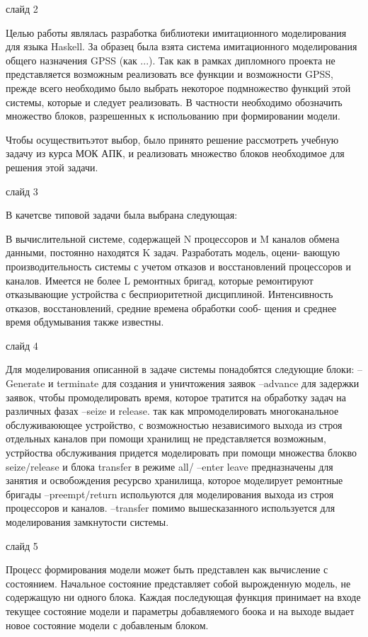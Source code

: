 \documentclass[utf8x, 12pt]{G7-32} %
\begin{document}
\thispagestyle{empty} 


слайд 2

Целью работы являлась разработка библиотеки имитационного  моделирования для языка Haskell. За образец была взята система имитационного моделирования общего назначения GPSS (как ...). Так как в рамках дипломного проекта не представляется возможным реализовать все функции и возможности GPSS, прежде всего необходимо было выбрать некоторое подмножество функций этой системы, которые и следует реализовать. В частности необходимо обозначить множество блоков, разрешенных к испольованию при формировании модели.

Чтобы осуществитьэтот выбор, было принято решение рассмотреть учебную задачу из курса МОК АПК, и реализовать множество блоков необходимое для решения этой задачи. 

слайд 3

В качетсве типовой задачи была выбрана следующая: 

В вычислительной системе, содержащей N процессоров и M каналов
обмена данными, постоянно находятся K задач. Разработать модель, оцени-
вающую производительность системы с учетом отказов и восстановлений
процессоров и каналов. Имеется не более L ремонтных бригад, которые
ремонтируют отказывающие устройства с бесприоритетной дисциплиной.
Интенсивность отказов, восстановлений, средние времена обработки сооб-
щения и среднее время обдумывания также известны.

слайд 4

Для моделирования описанной в задаче системы понадобятся следующие блоки:
--Generate и terminate для создания и уничтожения заявок
--advance для задержки заявок, чтобы промоделировать время, которое тратится на обработку задач на различных фазах
--seize и release. так как мпромоделировать многоканальное обслуживаюющее устройство, с возможностью независимого выхода из строя отдельных каналов при помощи хранилищ не представляется возможным, устрйоства обслуживания придется моделировать при помощи множества блокво seize/release и блока transfer в режиме all/
--enter leave предназначены для занятия и освобождения ресурсво хранилища, которое моделирует ремонтные бригады
--preempt/return испольуются для моделирования выхода из строя процессоров и каналов.
--transfer помимо вышесказанного используется для моделирования замкнутости системы.

слайд 5

Процесс формирования модели может быть представлен как вычисление с состоянием. Начальное состояние представляет собой вырожденную модель, не содержащую ни одного блока. Каждая последующая функция принимает на входе текущее состояние модели и параметры добавляемого боока и на выходе выдает новое состояние модели с добавленым блоком.
\end{document}
